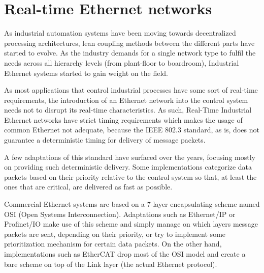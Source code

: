 \section{Real-time Ethernet networks}\label{sec:rt-networks}

As industrial automation systems have been moving towards decentralized processing architectures, lean coupling methods between the different parts have started to evolve.
As the industry demands for a single network type to fulfil the needs across all hierarchy levels (from plant-floor to boardroom), Industrial Ethernet systems started to gain weight on the field.

As most applications that control industrial processes have some sort of real-time requirements, the introduction of an Ethernet network into the control system needs not to disrupt its real-time characteristics.
As such, Real-Time Industrial Ethernet networks have strict timing requirements which makes the usage of common Ethernet not adequate, because the IEEE 802.3 standard, as is, does not guarantee a deterministic timing for delivery of message packets.

A few adaptations of this standard have surfaced over the years, focusing mostly on providing such deterministic delivery.
Some implementations categorize data packets based on their priority relative to the control system so that, at least the ones that are critical, are delivered as fast as possible.

Commercial Ethernet systems are based on a 7-layer encapsulating scheme named OSI (Open Systems Interconnection).
Adaptations such as Ethernet/IP or Profinet/IO make use of this scheme and simply manage on which layers message packets are sent, depending on their priority, or try to implement some prioritization mechanism for certain data packets.
On the other hand, implementations such as EtherCAT drop most of the OSI model and create a bare scheme on top of the Link layer (the actual Ethernet protocol).
